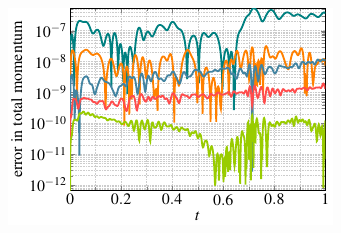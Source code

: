 \begin{figure}
\begin{subfigure}[]{0.48\linewidth}
  \caption{}
  \label{mass_error_KH}
  \end{subfigure}\hfill
  \begin{subfigure}[]{0.48\linewidth}
            \includegraphics[scale=1]{Figures/paper-figure6.pdf}
  \caption{}
  \label{momentum_error_KH}
  \end{subfigure}
  

\end{figure}
